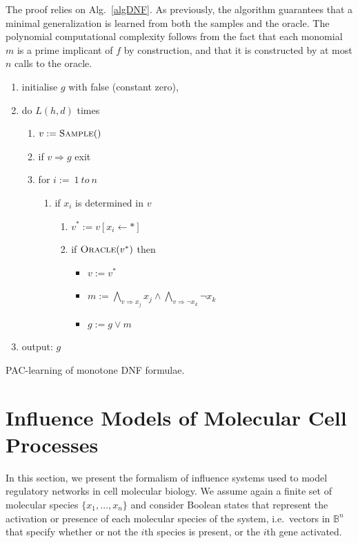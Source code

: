\documentclass{llncs}
\begin{document}
The proof relies on Alg.~\ref{algDNF}. As previously, the algorithm guarantees that a minimal generalization is learned from both the samples and the oracle.
The polynomial computational complexity follows from the fact that each monomial $m$ is a prime implicant
of $f$ by construction, and that it is constructed by at most $n$ calls to the
oracle.

\begin{algorithm}
\begin{enumerate}
\item initialise $g$ with false (constant zero),
\item
do $L(h,d)$ times 
\begin{enumerate}
\item $v:=\textsc{Sample}()$
	\item 
	if $v\Rightarrow g$ exit
\item for $i:=\ 1\ to \ n$
\begin{enumerate}
\item if $x_i$ is determined in $v$
\begin{enumerate}
\item $v^*:=v[x_i\leftarrow *]$
\item if $\textsc{Oracle}(v^*)$ then 
\begin{itemize}
\item $v:=v^*$
\item $m:=\bigwedge_{v\Rightarrow x_j} x_j\wedge\bigwedge_{v\Rightarrow\neg x_k}\neg x_k$ 
\item $g:=g\vee m$
\end{itemize}
\end{enumerate}
\end{enumerate}
\end{enumerate}
\item output: $g$
\end{enumerate}
\caption{PAC-learning of monotone DNF formulae.\label{algDNF}}
\end{algorithm}





\section{Influence Models of Molecular Cell Processes}

In this section, we present the formalism of influence systems used to model regulatory networks in cell molecular biology.
We assume again a finite set of molecular species $\{x_1,\dots,x_n\}$ 
and consider Boolean states that represent the activation or presence of each molecular species of the system, 
i.e.~vectors in $\mathbb{B}^n$ that specify whether or not the $i$th species is present, or the $i$th gene activated.
\end{document}
